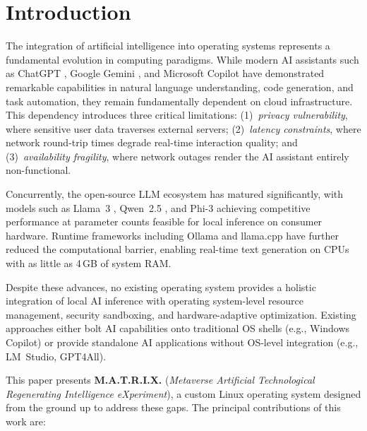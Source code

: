 \documentclass[conference]{IEEEtran}
\begin{document}

\section{Introduction}

The integration of artificial intelligence into operating systems represents a fundamental evolution in computing paradigms. While modern AI assistants such as ChatGPT \cite{openai2023gpt4}, Google Gemini \cite{google2024gemini}, and Microsoft Copilot \cite{microsoft2024copilot} have demonstrated remarkable capabilities in natural language understanding, code generation, and task automation, they remain fundamentally dependent on cloud infrastructure. This dependency introduces three critical limitations: (1)~\textit{privacy vulnerability}, where sensitive user data traverses external servers; (2)~\textit{latency constraints}, where network round-trip times degrade real-time interaction quality; and (3)~\textit{availability fragility}, where network outages render the AI assistant entirely non-functional.

Concurrently, the open-source LLM ecosystem has matured significantly, with models such as Llama~3 \cite{meta2024llama3}, Qwen~2.5 \cite{qwen2024qwen25}, and Phi-3 \cite{microsoft2024phi3} achieving competitive performance at parameter counts feasible for local inference on consumer hardware. Runtime frameworks including Ollama \cite{ollama2024} and llama.cpp \cite{llamacpp2024} have further reduced the computational barrier, enabling real-time text generation on CPUs with as little as 4\,GB of system RAM.

Despite these advances, no existing operating system provides a holistic integration of local AI inference with operating system-level resource management, security sandboxing, and hardware-adaptive optimization. Existing approaches either bolt AI capabilities onto traditional OS shells (e.g., Windows Copilot) or provide standalone AI applications without OS-level integration (e.g., LM~Studio, GPT4All).

This paper presents \textbf{M.A.T.R.I.X.} (\textit{Metaverse Artificial Technological Regenerating Intelligence eXperiment}), a custom Linux operating system designed from the ground up to address these gaps. The principal contributions of this work are:
\end{document}
